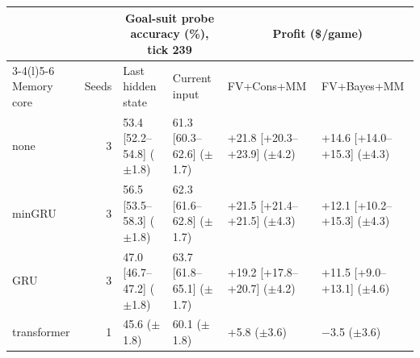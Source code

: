   \begin{tabular}{@{}lrllll@{}}
    \toprule
    & & \multicolumn{2}{c}{Goal-suit probe accuracy (\%), tick 239} & \multicolumn{2}{c}{Profit (\$/game)} \\
    \cmidrule(lr){3-4}\cmidrule(l){5-6}
    Memory core & Seeds & Last hidden state & Current input & FV+Cons+MM & FV+Bayes+MM \\
    \midrule
    none & 3 & 53.4 [52.2--54.8] ($\pm$1.8) & 61.3 [60.3--62.6] ($\pm$1.7) & +21.8 [+20.3--+23.9] ($\pm$4.2) & +14.6 [+14.0--+15.3] ($\pm$4.3) \\
    minGRU & 3 & 56.5 [53.5--58.3] ($\pm$1.8) & 62.3 [61.6--62.8] ($\pm$1.7) & +21.5 [+21.4--+21.5] ($\pm$4.3) & +12.1 [+10.2--+15.3] ($\pm$4.3) \\
    GRU & 3 & 47.0 [46.7--47.2] ($\pm$1.8) & 63.7 [61.8--65.1] ($\pm$1.7) & +19.2 [+17.8--+20.7] ($\pm$4.2) & +11.5 [+9.0--+13.1] ($\pm$4.6) \\
    transformer & 1 & 45.6 ($\pm$1.8) & 60.1 ($\pm$1.8) & +5.8 ($\pm$3.6) & $-$3.5 ($\pm$3.6) \\
    \bottomrule
  \end{tabular}
